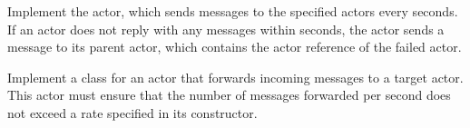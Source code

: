 \documentclass[11pt]{article}
\begin{document}
\begin{myExercise}
Implement the  actor, which sends  messages to the specified actors every  seconds. If an actor does not reply with any  messages within  seconds, the  actor sends a  message to its parent actor, which contains the actor reference of the failed actor.
\end{myExercise}



\begin{myExercise}
Implement a  class for an actor that forwards incoming messages to a target actor. This actor must ensure that the number of messages forwarded per second does not exceed a rate specified in its constructor.
\end{myExercise}
\end{document}
